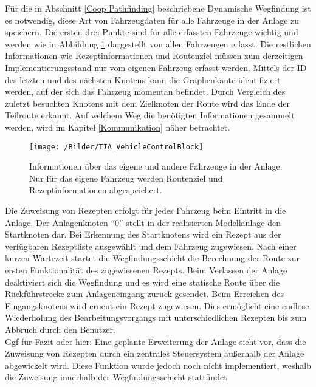 			Für die in Abschnitt \ref{Coop Pathfinding} beschriebene Dynamische Wegfindung ist es notwendig, diese Art von Fahrzeugdaten für alle Fahrzeuge in der Anlage zu speichern. Die ersten drei Punkte sind für alle erfassten Fahrzeuge wichtig und werden wie in Abbildung \ref{VehicleControlBlock} dargestellt von allen Fahrzeugen erfasst. Die restlichen Informationen wie Rezeptinformationen und Routenziel müssen zum derzeitigen Implementierungsstand nur vom eigenen Fahrzeug erfasst werden. Mittels der ID des letzten und des nächsten Knotens kann die Graphenkante identifiziert werden, auf der sich das Fahrzeug momentan befindet. Durch Vergleich des zuletzt besuchten Knotens mit dem Zielknoten der Route wird das Ende der Teilroute erkannt. Auf welchem Weg die benötigten Informationen gesammelt werden, wird im  Kapitel \ref{Kommunikation} näher betrachtet.
			
			\begin{figure}[h]
				\centering
				\texttt{[image: /Bilder/TIA\_VehicleControlBlock]}
				\vspace{0.2cm}
				\caption{Informationen über das eigene und andere Fahrzeuge in der Anlage. Nur für das eigene Fahrzeug werden Routenziel und Rezeptinformationen abgespeichert.}\label{VehicleControlBlock}
			\end{figure}
			Die Zuweisung von Rezepten erfolgt für jedes Fahrzeug beim Eintritt in die Anlage. Der Anlagenknoten "`0"' stellt in der realisierten Modellanlage den Startknoten dar. Bei Erkennung des Startknotens wird ein Rezept aus der verfügbaren Rezeptliste ausgewählt und dem Fahrzeug zugewiesen. Nach einer kurzen Wartezeit startet die Wegfindungsschicht die Berechnung der Route zur ersten Funktionalität des zugewiesenen Rezepts. Beim Verlassen der Anlage deaktiviert sich die Wegfindung und es wird eine statische Route über die Rückführstrecke zum Anlageneingang zurück gesendet. Beim Erreichen des Eingangsknotens wird erneut ein Rezept zugewiesen. Dies ermöglicht eine endlose Wiederholung des Bearbeitungsvorgangs  mit unterschiedlichen Rezepten bis zum Abbruch durch den Benutzer.
			\\[4pt]
			Ggf für Fazit oder hier: Eine geplante Erweiterung der Anlage sieht vor, dass die Zuweisung von Rezepten durch ein zentrales Steuersystem außerhalb der Anlage abgewickelt wird. Diese Funktion wurde jedoch noch nicht implementiert, weshalb die Zuweisung innerhalb der Wegfindungsschicht stattfindet.
			
		
